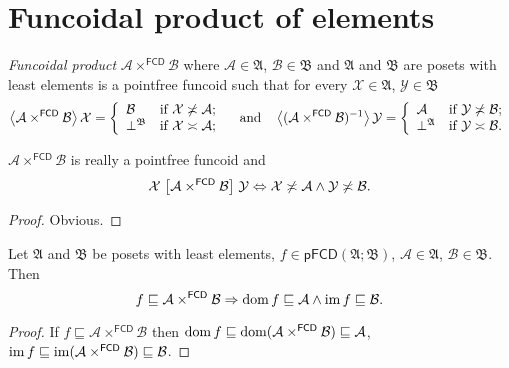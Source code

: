 \section{Funcoidal product of elements}
\begin{defn}
\emph{Funcoidal product} $\mathcal{A}\times^{\mathsf{FCD}}\mathcal{B}$
where $\mathcal{A}\in\mathfrak{A}$, $\mathcal{B}\in\mathfrak{B}$
and $\mathfrak{A}$ and $\mathfrak{B}$ are posets with least elements
is a pointfree funcoid such that for every $\mathcal{X}\in\mathfrak{A}$,
$\mathcal{Y}\in\mathfrak{B}$ 
\[
\left\langle \mathcal{A}\times^{\mathsf{FCD}}\mathcal{B}\right\rangle\mathcal{X}=\left\{ \begin{array}{ll}
\mathcal{B} & \text{if }\mathcal{X}\not\asymp\mathcal{A};\\
\bot^{\mathfrak{B}} & \text{if }\mathcal{X}\asymp\mathcal{A};
\end{array}\right.\hspace{1em}\text{and}\hspace{1em}\left\langle (\mathcal{A}\times^{\mathsf{FCD}}\mathcal{B})^{-1}\right\rangle\mathcal{Y}=\left\{ \begin{array}{ll}
\mathcal{A} & \text{if }\mathcal{Y}\not\asymp\mathcal{B};\\
\bot^{\mathfrak{A}} & \text{if }\mathcal{Y}\asymp\mathcal{B}.
\end{array}\right.
\]
\end{defn}
\begin{prop}
$\mathcal{A}\times^{\mathsf{FCD}}\mathcal{B}$ is really a pointfree
funcoid and 
\[
\mathcal{X}\mathrel{\left[\mathcal{A}\times^{\mathsf{FCD}}\mathcal{B}\right]}\mathcal{Y}\Leftrightarrow\mathcal{X}\not\asymp\mathcal{A}\wedge\mathcal{Y}\not\asymp\mathcal{B}.
\]
\end{prop}
\begin{proof}
Obvious.\end{proof}
\begin{prop}
Let $\mathfrak{A}$ and $\mathfrak{B}$ be posets with least elements,
$f\in\mathsf{pFCD}(\mathfrak{A};\mathfrak{B})$, $\mathcal{A}\in\mathfrak{A}$,
$\mathcal{B}\in\mathfrak{B}$. Then
\[
f\sqsubseteq\mathcal{A}\times^{\mathsf{FCD}}\mathcal{B}\Rightarrow\operatorname{dom} f\sqsubseteq\mathcal{A}\wedge\operatorname{im} f\sqsubseteq\mathcal{B}.
\]
\end{prop}
\begin{proof}
If $f\sqsubseteq\mathcal{A}\times^{\mathsf{FCD}}\mathcal{B}$ then
$\operatorname{dom} f\sqsubseteq\operatorname{dom}(\mathcal{A}\times^{\mathsf{FCD}}\mathcal{B})\sqsubseteq\mathcal{A}$,
$\operatorname{im} f\sqsubseteq\operatorname{im}(\mathcal{A}\times^{\mathsf{FCD}}\mathcal{B})\sqsubseteq\mathcal{B}$.\end{proof}
